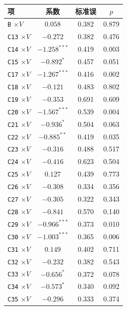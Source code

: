 \begin{center}
\begin{threeparttable}
\caption{完全交互的行业虚拟变量 $\times$ 重点排污单位}
\label{tab:keypoll-industry}
\footnotesize
\begin{tabular}{lccc}
\toprule
项 & 系数 & 标准误 & \(p\) \\
\midrule
\texttt{B} $\times V$ & $0.058$ & 0.382 & 0.879 \\
\texttt{C13} $\times V$ & $-0.272$ & 0.382 & 0.476 \\
\texttt{C14} $\times V$ & $-1.258^{***}$ & 0.419 & 0.003 \\
\texttt{C15} $\times V$ & $-0.892^{*}$ & 0.457 & 0.051 \\
\texttt{C17} $\times V$ & $-1.267^{***}$ & 0.416 & 0.002 \\
\texttt{C18} $\times V$ & $-0.121$ & 0.483 & 0.802 \\
\texttt{C19} $\times V$ & $-0.353$ & 0.691 & 0.609 \\
\texttt{C20} $\times V$ & $-1.567^{***}$ & 0.539 & 0.004 \\
\texttt{C21} $\times V$ & $-0.936^{*}$ & 0.504 & 0.063 \\
\texttt{C22} $\times V$ & $-0.885^{**}$ & 0.419 & 0.035 \\
\texttt{C23} $\times V$ & $-0.316$ & 0.488 & 0.517 \\
\texttt{C24} $\times V$ & $-0.416$ & 0.623 & 0.504 \\
\texttt{C25} $\times V$ & $0.127$ & 0.439 & 0.773 \\
\texttt{C26} $\times V$ & $-0.308$ & 0.334 & 0.356 \\
\texttt{C27} $\times V$ & $-0.305$ & 0.322 & 0.343 \\
\texttt{C28} $\times V$ & $-0.841$ & 0.570 & 0.140 \\
\texttt{C29} $\times V$ & $-0.966^{***}$ & 0.373 & 0.010 \\
\texttt{C30} $\times V$ & $-1.003^{***}$ & 0.365 & 0.006 \\
\texttt{C31} $\times V$ & $0.149$ & 0.402 & 0.711 \\
\texttt{C32} $\times V$ & $-0.232$ & 0.382 & 0.543 \\
\texttt{C33} $\times V$ & $-0.656^{*}$ & 0.372 & 0.078 \\
\texttt{C34} $\times V$ & $-0.573^{*}$ & 0.340 & 0.092 \\
\texttt{C35} $\times V$ & $-0.296$ & 0.333 & 0.374 \\
\bottomrule
\end{tabular}
\end{threeparttable}
\end{center}

